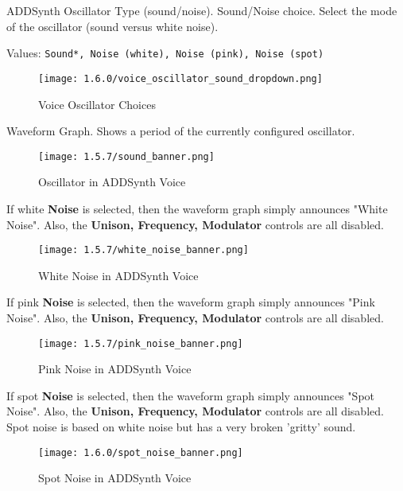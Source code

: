    ADDSynth Oscillator Type (sound/noise).
   Sound/Noise choice.
   Select the mode of the oscillator (sound versus white noise).

   Values: \texttt{Sound*, Noise (white), Noise (pink), Noise (spot)}

\begin{figure}[H]
   \centering
   \texttt{[image: 1.6.0/voice\_oscillator\_sound\_dropdown.png]}
   \caption{Voice Oscillator Choices}
   \label{fig:voice_oscillator_choices}
\end{figure}

   Waveform Graph.
   Shows a period of the currently configured oscillator.

\begin{figure}[H]
   \centering
   \texttt{[image: 1.5.7/sound\_banner.png]}
   \caption{Oscillator in ADDSynth Voice}
   \label{fig:voice_oscillator_oscillator}
\end{figure}

   If white \textbf{Noise} is selected, then the waveform graph simply announces
   "White Noise".  Also, the \textbf{Unison, Frequency, Modulator} controls are
   all disabled.

\begin{figure}[H]
   \centering
   \texttt{[image: 1.5.7/white\_noise\_banner.png]}
   \caption{White Noise in ADDSynth Voice}
   \label{fig:voice_oscillator_white_noise}
\end{figure}

   If pink \textbf{Noise} is selected, then the waveform graph simply announces
   "Pink Noise".  Also, the \textbf{Unison, Frequency, Modulator} controls are
   all disabled.

\begin{figure}[H]
   \centering
   \texttt{[image: 1.5.7/pink\_noise\_banner.png]}
   \caption{Pink Noise in ADDSynth Voice}
   \label{fig:voice_oscillator_pink_noise}
\end{figure}

   If spot \textbf{Noise} is selected, then the waveform graph simply announces
   "Spot Noise".  Also, the \textbf{Unison, Frequency, Modulator} controls are
   all disabled.
   Spot noise is based on white noise but has a very broken 'gritty' sound.

\begin{figure}[H]
   \centering
   \texttt{[image: 1.6.0/spot\_noise\_banner.png]}
   \caption{Spot Noise in ADDSynth Voice}
   \label{fig:voice_oscillator_spot_noise}
\end{figure}

